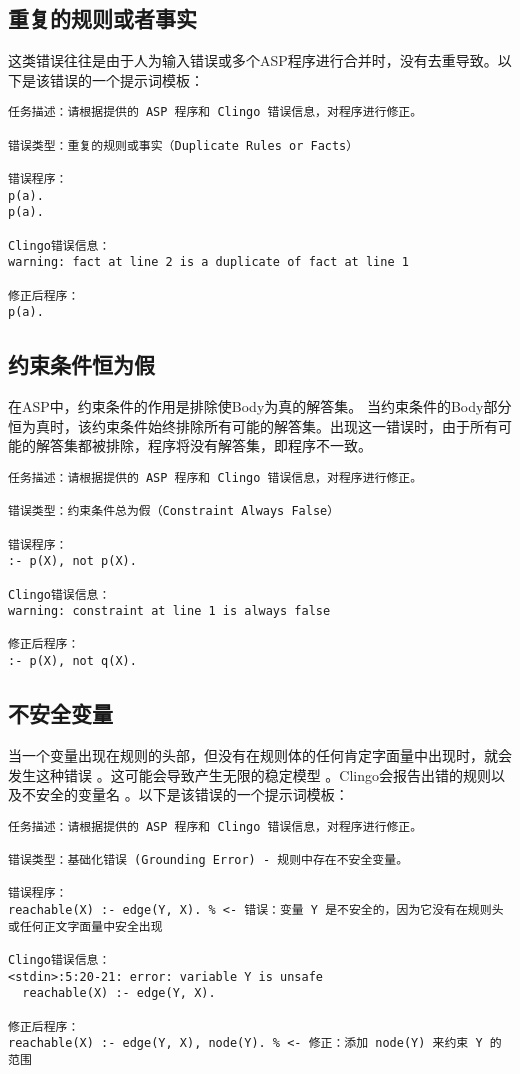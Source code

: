 \subsection{重复的规则或者事实}
这类错误往往是由于人为输入错误或多个ASP程序进行合并时，没有去重导致。以下是该错误的一个提示词模板：
\begin{lstlisting}
任务描述：请根据提供的 ASP 程序和 Clingo 错误信息，对程序进行修正。

错误类型：​重复的规则或事实（Duplicate Rules or Facts）​

错误程序：
p(a).
p(a).

Clingo错误信息：
warning: fact at line 2 is a duplicate of fact at line 1

修正后程序：
p(a).
\end{lstlisting}
\subsection{约束条件恒为假}
在ASP中，约束条件的作用是排除使Body为真的解答集。
当约束条件的Body部分恒为真时，该约束条件始终排除所有可能的解答集。出现这一错误时，由于所有可能的解答集都被排除，程序将没有解答集，即程序不一致。
\begin{lstlisting}
任务描述：请根据提供的 ASP 程序和 Clingo 错误信息，对程序进行修正。

错误类型：​约束条件总为假（Constraint Always False）

错误程序：
:- p(X), not p(X).

Clingo错误信息：
warning: constraint at line 1 is always false

修正后程序：
:- p(X), not q(X).
\end{lstlisting}
\subsection{不安全变量}
当一个变量出现在规则的头部，但没有在规则体的任何肯定字面量中出现时，就会发生这种错误 。这可能会导致产生无限的稳定模型 。Clingo会报告出错的规则以及不安全的变量名 。以下是该错误的一个提示词模板：
\begin{lstlisting}
任务描述：请根据提供的 ASP 程序和 Clingo 错误信息，对程序进行修正。

错误类型：基础化错误 (Grounding Error) - 规则中存在不安全变量。

错误程序：
reachable(X) :- edge(Y, X). % <- 错误：变量 Y 是不安全的，因为它没有在规则头或任何正文字面量中安全出现

Clingo错误信息：
<stdin>:5:20-21: error: variable Y is unsafe
  reachable(X) :- edge(Y, X).

修正后程序：
reachable(X) :- edge(Y, X), node(Y). % <- 修正：添加 node(Y) 来约束 Y 的范围
\end{lstlisting}
